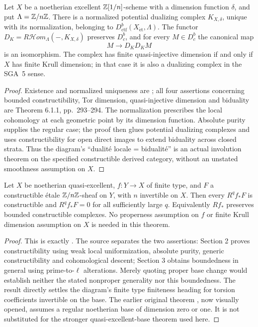 \begin{theorem}\label{thm:B3-local-biduality}
Let $X$ be a noetherian excellent ${\mathbb{Z}}[1/n]$-scheme with a dimension
function $\delta$, and put $\Lambda={\mathbb{Z}}/n{\mathbb{Z}}$. There is a normalized
potential dualizing complex $K_{X,\delta}$, unique with its
normalization, belonging to $D^b_{\mathrm{ctf}}(X_{\mathrm{\acute et}},\Lambda)$.
The functor $D_K=R\mathcal Hom_\Lambda(-,K_{X,\delta})$ preserves
$D^b_c$, and for every $M\in D^b_c$ the canonical map
\[
                            M\longrightarrow D_KD_KM
\]
is an isomorphism. The complex has finite quasi-injective dimension
if and only if $X$ has finite Krull dimension; in that case it is
also a dualizing complex in the SGA~5 sense.
\end{theorem}
\begin{proof}
Existence and normalized uniqueness are
\cite[Expos\'e XVII, Theorem 5.1.1, p.~287]{BILO2014}; all four
assertions concerning bounded constructibility, Tor dimension,
quasi-injective dimension and biduality are Theorem 6.1.1,
pp.~293--294. The normalization prescribes the local cohomology
at each geometric point by its dimension function. Absolute
purity supplies the regular case; the proof then glues potential
dualizing complexes and uses constructibility for open direct
images to extend biduality across closed strata. Thus the diagram's
``dualit\'e locale = bidualit\'e'' is an actual involution theorem
on the specified constructible derived category, without an
unstated smoothness assumption on $X$.
\end{proof}

\begin{theorem}\label{thm:B3-finiteness}
Let $X$ be noetherian quasi-excellent, $f:Y\to X$ of finite type,
and $F$ a constructible \'etale ${\mathbb{Z}}/n{\mathbb{Z}}$-sheaf on $Y$, with $n$
invertible on $X$. Then every $R^qf_*F$ is constructible and
$R^qf_*F=0$ for all sufficiently large $q$. Equivalently
$Rf_*$ preserves bounded constructible complexes. No properness
assumption on $f$ or finite Krull dimension assumption on $X$
is needed in this theorem.
\end{theorem}
\begin{proof}
This is exactly \cite[Expos\'e XIII, Theorem 1.1.1 and 1.1.2,
p.~195]{BILO2014}. The source separates the two assertions:
Section 2 proves constructibility using weak local uniformization,
absolute purity, generic constructibility and cohomological
descent; Section 3 obtains boundedness in general using
prime-to-$\ell$ alterations. Merely quoting proper base change
would establish neither the stated nonproper generality nor this
boundedness. The result directly settles the diagram's finite type
finiteness heading for torsion coefficients invertible on the base.
The earlier original theorem
\cite[Th\'eor\`emes de finitude, Theorem 1.1 and Corollary 1.5,
pp.~233--234]{BSGA4Half}, now visually opened, assumes a regular
noetherian base of dimension zero or one. It is not substituted for
the stronger quasi-excellent-base theorem used here.
\end{proof}

